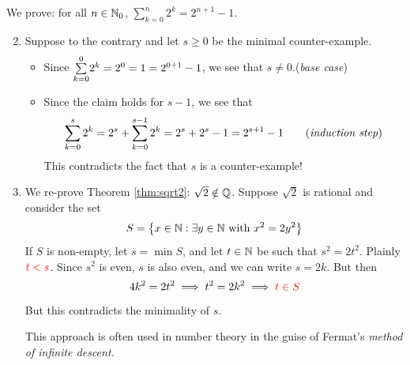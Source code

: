 \begin{examples}{}{}
	\exstart We prove: for all $n\in\mathbb{N}_0$, $\sum\limits_{k=0}^n 2^k=2^{n+1}-1$.\vspace{-10pt}
	
	\begin{enumerate}\setcounter{enumi}{1}
	  \item[]Suppose to the contrary and let $s\ge 0$ be the minimal counter-example.
	  \begin{itemize}
	    \item Since $\smash[t]{\sum\limits_{k=0}^0} 2^k=2^0=1=2^{0+1}-1$, we see that $s\neq 0$.\hfill (\emph{base case})
	    \item Since the claim holds for $s-1$, we see that
	    \[
	    	\sum\limits_{k=0}^s2^k=2^s+\sum\limits_{k=0}^{s-1} 2^k =2^s+2^s-1=2^{s+1}-1 \tag{\emph{induction step}}
	    \]
	    This contradicts the fact that $s$ is a counter-example!
	  \end{itemize} 
	  
	  
	  \item We re-prove Theorem \ref{thm:sqrt2}: $\sqrt 2\notin\mathbb{Q}$. Suppose $\sqrt 2$ is rational and consider the set
	  \[
	  	S=\bigl\{x\in\mathbb{N}:\exists y\in \mathbb{N}\text{ with }x^2=2y^2\bigr\}
	  \]
	  If $S$ is non-empty, let $s=\min S$, and let $t\in\mathbb{N}$ be such that $s^2=2t^2$. Plainly $\textcolor{red}{t<s}$. Since $s^2$ is even, $s$ is also even, and we can write $s=2k$. But then
	  \[
	  	4k^2=2t^2\implies t^2=2k^2\implies \textcolor{red}{t\in S}
	  \]
	  But this contradicts the minimality of $s$.\par
	  This approach is often used in number theory in the guise of Fermat's \emph{method of infinite descent.}
	\end{enumerate}
\end{examples}




